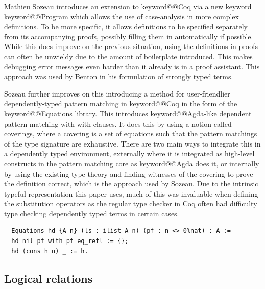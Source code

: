 \documentclass[12pt, final]{article}
\makeatletter
\def\<#1>{\csname keyword@@#1\endcsname}
\makeatother
\begin{document}
Mathieu Sozeau introduces an extension to \<Coq> via a new keyword \<Program> which allows the use of case-analysis in more complex definitions\cite{Sozeau2006}\cite{Sozeau2007}.
To be more specific, it allows definitions to be specified separately from its accompanying proofs, possibly filling them in automatically if possible.
While this does improve on the previous situation, using the definitions in proofs can often be unwieldy due to the amount of boilerplate introduced.
This makes debugging error messages even harder than it already is in a proof assistant. This approach was used by Benton in his formulation of strongly typed terms.

Sozeau further improves on this introducing a method for user-friendlier dependently-typed pattern matching in \<Coq> in the form of the \<Equations> library\cite{Sozeau2010}\cite{Sozeau2019}.
This introduces \<Agda>-like dependent pattern matching with with-clauses.
It does this by using a notion called coverings, where a covering is a set of equations such that the pattern matchings of the type signature are exhaustive.
There are two main ways to integrate this in a dependently typed environment, externally where it is integrated as high-level constructs in the pattern matching core as \<Agda> does it, or internally by using the existing type theory and finding witnesses of the covering to prove the definition correct, which is the approach used by Sozeau.
Due to the intrinsic typeful representation this paper uses, much of this was invaluable when defining the substitution operators as the regular type checker in Coq often had difficulty type checking dependently typed terms in certain cases.

\begin{listing}
  \begin{verbatim}
  Equations hd {A n} (ls : ilist A n) (pf : n <> 0%nat) : A :=
  hd nil pf with pf eq_refl := {};
  hd (cons h n) _ := h.
  \end{verbatim}
  \caption{Definition of hd using \<Equations>}
  \label{lst:dt_ilist_hd_equations}
\end{listing}


\subsection{Logical relations}
\end{document}

